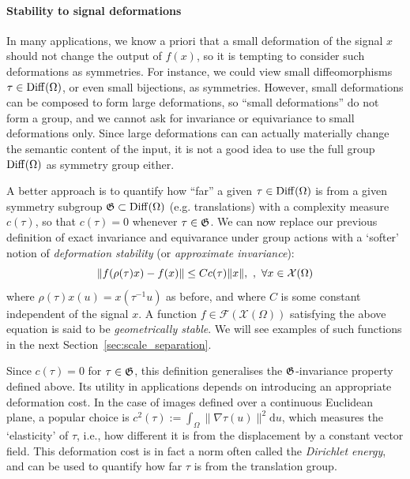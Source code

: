 \paragraph{Stability to signal deformations}
In many applications, we know a priori that a small deformation of the signal $x$ should not change the output of $f(x)$, so it is tempting to consider such deformations as symmetries.
For instance, we could view small diffeomorphisms $\tau \in \operatorname{Diff}(\Omega)$, or even small bijections, as symmetries.
However, small deformations can be composed to form large deformations, so ``small deformations'' do not form a group, and we cannot ask for invariance or equivariance to small deformations only.
Since large deformations can can actually materially change the semantic content of the input, it is not a good idea to use the full group $\operatorname{Diff}(\Omega)$ as symmetry group either.

A better approach is to quantify how ``far'' a given $\tau \in \operatorname{Diff}(\Omega)$ is from a given symmetry subgroup ${\mathfrak{G}} \subset \operatorname{Diff}(\Omega)$ (e.g. translations)
with a complexity measure $c(\tau)$, so that $c(\tau) = 0$ whenever $\tau \in {\mathfrak{G}}$. 
We can now replace our previous  definition of exact invariance and equivarance under group actions with a `softer' notion of  
\emph{deformation stability} (or {\em approximate invariance}):
\begin{equation}
\label{eq:defstability1}
\| f(\rho(\tau) x) - f(x)\| \leq C c(\tau) \|x\|,~,~    \forall x\in {\mathcal{X}}(\Omega)
\end{equation}
where $\rho(\tau)x(u) = x(\tau^{-1} u)$ as before, and where $C$ is some constant independent of the signal $x$. 
A function $f\in \mathcal{F}(\mathcal{X}(\Omega))$ satisfying the above equation is said to be {\em geometrically stable}. 
%
We will see examples of such functions in the next Section~\ref{sec:scale_separation}. 


Since $c(\tau)=0$ for $\tau \in {\mathfrak{G}}$, this definition generalises the ${\mathfrak{G}}$-invariance property defined above. Its utility in applications depends on introducing an appropriate deformation cost. In the case of images defined over a continuous Euclidean plane, 
a popular choice is $c^2(\tau) := \int_\Omega \| \nabla \tau(u)\|^2 \mathrm{d}u$, which measures the `elasticity' of $\tau$, i.e., how different it is from the displacement by a constant vector field. 
%
This deformation cost is in fact a norm often called the {\em Dirichlet energy}, and can be used to quantify how far $\tau$ is from the translation group. 


